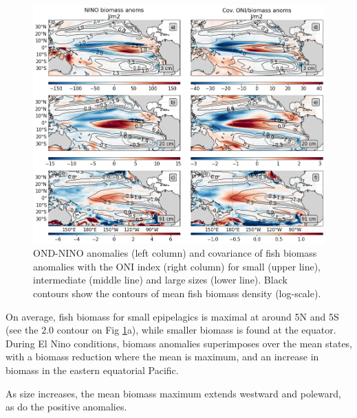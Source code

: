 \begin{figure}[htp]
	\centering
	\includegraphics[scale=0.4]{figs/map_mean_anom_OND_97.png}	
	\caption{OND-NINO anomalies (left column) and covariance of fish biomass anomalies with the ONI index (right column) for small (upper line), intermediate (middle line) and large sizes (lower line). Black contours show the contours of mean fish biomass density (log-scale).}	
	\label{fig:mean_ond97_ape}
\end{figure}

On average, fish biomass for small epipelagics is maximal at around 5\degree{}N and 5\degree{}S (see the $2.0$ contour on Fig \ref{fig:mean_ond97_ape}a), while smaller biomass is found at the equator. During El Nino conditions, biomass anomalies superimposes over the mean states, with a biomass reduction where the mean is maximum, and an increase in biomass in the eastern equatorial Pacific.

As size increases, the mean biomass maximum extends westward and poleward, as do the positive anomalies.

%
%
%

